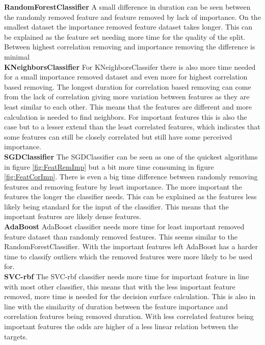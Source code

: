 \documentclass[a4paper,10pt]{article}
\begin{document}
\textbf{RandomForestClassifier} A small difference in duration can be seen between the randomly removed feature and feature removed by lack of importance. On the smallest dataset the importance removed feature dataset takes longer. This can be explained as the feature set needing more time for the quality of the split. Between highest correlation removing and importance removing the difference is minimal\\

\textbf{KNeighborsClassifier} For KNeighborsClassifer there is also more time needed for a small importance removed dataset and even more for highest correlation based removing. The longest duration for correlation based removing can come from the lack of correlation giving more variation between features as they are least similar to each other. This means that the features are different and more calculation is needed to find neighbors. For important features this is also the case but to a lesser extend than the least correlated features, which indicates that some features can still be closely correlated but still have some perceived importance.\\

\textbf{SGDClassifier} The SGDClassifier can be seen as one of the quickest algorithms in figure \ref{fig:FeatRemImp} but a bit more time consuming in figure \ref{fig:FeatCorImp}. There is even a big time difference between randomly removing features and removing feature by least importance. The more important the features the longer the classifier needs. This can be explained as the features less likely being standard for the input of the classifier. This means that the important features are likely dense features. \\

\textbf{AdaBoost} AdaBoost classifier needs more time for least important removed feature dataset than randomly removed features. This seems similar to the RandomForestClassifier. With the important features left AdaBoost has a harder time to classify outliers which the removed features were more likely to be used for. \\

\textbf{SVC-rbf} The SVC-rbf classifier needs more time for important feature in line with most other classifier, this means that with the less important feature removed, more time is needed for the decision surface calculation. This is also in line with the similarity of duration between the feature importance and correlation features being removed duration. With less correlated features being important features the odds are higher of a less linear relation between the targets. \\
\end{document}
